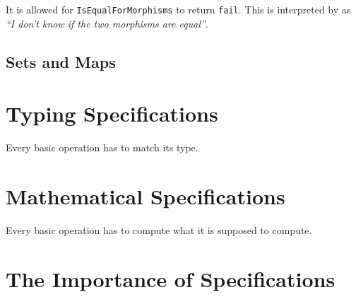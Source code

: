 \begin{remark}
 It is allowed for \texttt{IsEqualForMorphisms} to return \texttt{fail}. This is interpreted by \CapPkg as
 \textit{``I don't know if the two morphisms are equal''}.
\end{remark}



\subsection{\GAP Sets and \GAP Maps}

\section{Typing Specifications}

\begin{specification}
 Every basic operation has to match its type.
\end{specification}

\section{Mathematical Specifications}

\begin{specification}
 Every basic operation has to compute what it is supposed to compute.
\end{specification}

\section{The Importance of Specifications}